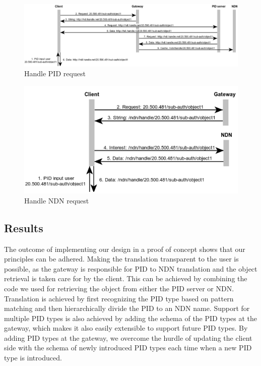 \begin{figure}[H]
    \centering
    \includegraphics[width=\textwidth]{Images/pid_seq5.png}
    \caption{Handle PID request\label{fig:seq_pid}}
\end{figure}

\begin{figure}[H]
\includegraphics[scale=0.75]{Images/ndn_req.png}
\caption{Handle NDN request}
\label{fig:seq_ndn}
\end{figure}

\subsection{Results}
The outcome of implementing our design in a proof of concept shows that our principles can be adhered. Making the translation transparent to the user is possible, as the gateway is responsible for PID to NDN translation and the object retrieval is taken care for by the client. This can be achieved by combining the code we used for retrieving the object from either the PID server or NDN. Translation is achieved by first recognizing the PID type based on pattern matching and then hierarchically divide the PID to an NDN name. Support for multiple PID types is also achieved by adding the schema of the PID types at the gateway, which makes it also easily extensible to support future PID types. By adding PID types at the gateway, we overcome the hurdle of updating the client side with the schema of newly introduced PID types each time when a new PID type is introduced.